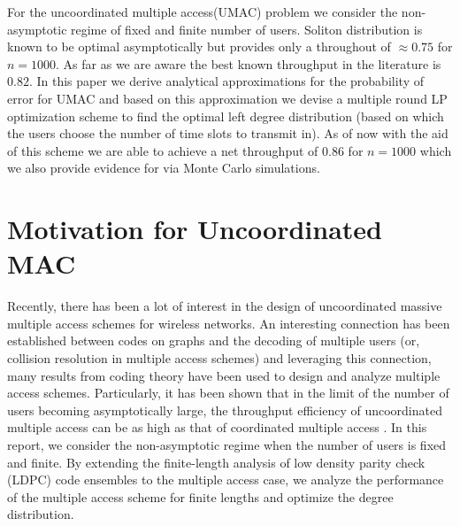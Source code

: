 For the uncoordinated multiple access(UMAC) problem we consider the non-asymptotic regime of fixed and finite number of users. Soliton distribution  is known to be optimal asymptotically but provides only a throughout of $\approx 0.75$ for $n=1000$. As far as we are aware the best known throughput in the literature is $0.82$. In this paper we derive analytical approximations for the probability of error for UMAC and based on this approximation we devise a multiple round LP optimization scheme to find the optimal left degree distribution (based on which the users choose the number of time slots to transmit in). As of now with the aid of this scheme we are able to achieve a net throughput of $0.86$ for $n=1000$ which we also provide evidence for via Monte Carlo simulations.

\section{Motivation for Uncoordinated MAC}
Recently, there has been a lot of interest in the design of uncoordinated massive multiple access schemes for wireless networks. An interesting connection has been established between codes on graphs and the decoding of multiple users (or, collision resolution in multiple access schemes) and leveraging this connection, many results from coding theory have been used to design and analyze multiple access schemes. Particularly, it has been shown that in the limit of the number of users becoming asymptotically large, the throughput efficiency of uncoordinated multiple access can be as high as that of coordinated multiple access \cite{narayanan2012iterative}. In this report, we consider the non-asymptotic regime when the number of users is fixed and finite. By extending the finite-length analysis of low density parity check (LDPC) code ensembles \cite{amraoui2007find} to the multiple access case, we analyze the performance of the multiple access scheme for finite lengths and optimize the degree distribution.

